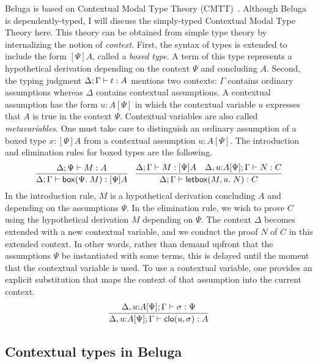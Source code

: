 Beluga is based on Contextual Modal Type Theory (CMTT)~\cite{Nanevski:ICML05}.
Although Beluga is dependently-typed, I will discuss the simply-typed Contextual
Modal Type Theory here.
This theory can be obtained from simple type theory by internalizing the notion
of \emph{context}.
First, the syntax of types is extended to include the form $[\Psi]A$, called a
\emph{boxed type}.
A term of this type represents a hypothetical derivation depending on the
context $\Psi$ and concluding $A$.
Second, the typing judgment $\Delta; \Gamma \vdash t : A$ mentions two
contexts:
$\Gamma$ contains ordinary assumptions whereas $\Delta$ contains contextual
assumptions.
A contextual assumption has the form $u : A[\Psi]$ in which the
contextual variable $u$ expresses that $A$ is true in the context $\Psi$.
Contextual variables are also called \emph{metavariables}.
One must take care to distinguish an ordinary assumption of a boxed type
$x : [\Psi]A$ from a contextual assumption $u : A[\Psi]$.
The introduction and elimination rules for boxed types are the following.
\[
  \infer{%
    \Delta; \Gamma \proves \mathsf{box}(\Psi.\; M) : [\Psi]A
  }{%
    \Delta; \Psi \proves M : A
  }
  \quad
  \infer{%
    \Delta; \Gamma \proves \mathsf{letbox}(M, u.\; N) : C
  }{%
    \Delta; \Gamma \proves M : [\Psi]A
    &
    \Delta, u{:}A[\Psi]; \Gamma \proves N : C
  }
\]
In the introduction rule, $M$ is a hypothetical derivation concluding $A$ and
depending on the assumptions $\Psi$.
In the elimination rule, we wish to prove $C$ using the hypothetical derivation
$M$ depending on $\Psi$. The context $\Delta$ becomes extended with a new
contextual variable, and we conduct the proof $N$ of $C$ in this extended
context.
In other words, rather than demand upfront that the assumptions $\Psi$ be
instantiated with some terms, this is delayed until the moment that the
contextual variable is used. To use a contextual variable, one provides an
explicit substitution that maps the context of that assumption into the current
context.
\[
  \infer{%
    \Delta, u{:}A[\Psi]; \Gamma \proves \mathsf{clo}(u, \sigma) : A
  }{%
    \Delta, u{:}A[\Psi]; \Gamma \proves \sigma : \Psi
  }
\]

\subsection{Contextual types in Beluga}

